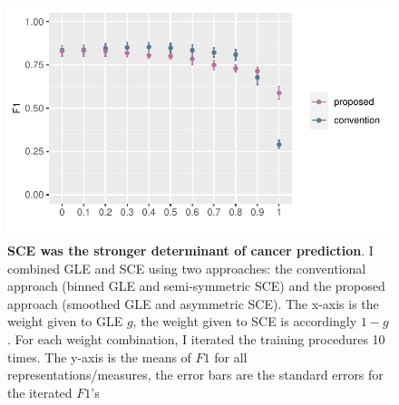 \begin{figure}[h!]
    \centering
    \includegraphics[scale=1]{graphics/f1_combined.pdf}
    \caption{\textbf{SCE was the stronger determinant of cancer prediction}. I combined GLE and SCE using two approaches: the conventional approach (binned GLE and semi-symmetric SCE) and the proposed approach (smoothed GLE and asymmetric SCE). The x-axis is the weight given to GLE $g$, the weight given to SCE is accordingly $1-g$. For each weight combination, I iterated the training procedures 10 times. The y-axis is the means of $F1$ for all representations/measures, the error bars are the standard errors for the iterated $F1$'s}
    \label{fig:f1_combined}
\end{figure}
